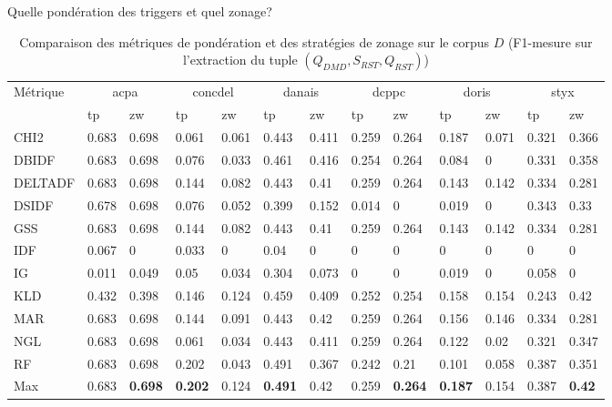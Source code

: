 \documentclass[newPxFont,pagenumber]{beamer}
\begin{document}
\begin{frame}{Quelle pondération des triggers et quel  zonage?}
\begin{table}[]
\tiny
\begin{flushleft}
\caption{Comparaison des métriques de pondération et des stratégies de zonage sur le corpus $D$ (F1-mesure sur l'extraction du tuple $(Q_{DMD},S_{RST}, Q_{RST})$)}
\label{my-label}
\begin{tabular}{l|ll|ll|ll|ll|ll|ll}
Métrique & \multicolumn{2}{c|}{acpa} &  \multicolumn{2}{c|}{concdel}  &  \multicolumn{2}{c|}{danais} &  \multicolumn{2}{c|}{dcppc} &  \multicolumn{2}{c|}{doris}   &  \multicolumn{2}{c}{styx}    \\ \noalign{\smallskip}
\hline
         & tp    & zw    & tp      & zw    & tp     & zw    & tp    & zw    & tp    & zw    & tp    & zw    \\ \noalign{\smallskip}
\hline
CHI2     & 0.683 & 0.698 & 0.061   & 0.061 & 0.443  & 0.411 & 0.259 & 0.264 & 0.187 & 0.071 & 0.321 & 0.366 \\
DBIDF    & 0.683 & 0.698 & 0.076   & 0.033 & 0.461  & 0.416 & 0.254 & 0.264 & 0.084 & 0     & 0.331 & 0.358 \\
DELTADF  & 0.683 & 0.698 & 0.144   & 0.082 & 0.443  & 0.41  & 0.259 & 0.264 & 0.143 & 0.142 & 0.334 & 0.281 \\
DSIDF    & 0.678 & 0.698 & 0.076   & 0.052 & 0.399  & 0.152 & 0.014 & 0     & 0.019 & 0     & 0.343 & 0.33  \\
GSS      & 0.683 & 0.698 & 0.144   & 0.082 & 0.443  & 0.41  & 0.259 & 0.264 & 0.143 & 0.142 & 0.334 & 0.281 \\
IDF      & 0.067 & 0     & 0.033   & 0     & 0.04   & 0     & 0     & 0     & 0     & 0     & 0     & 0     \\
IG       & 0.011 & 0.049 & 0.05    & 0.034 & 0.304  & 0.073 & 0     & 0     & 0.019 & 0     & 0.058 & 0     \\
KLD      & 0.432 & 0.398 & 0.146   & 0.124 & 0.459  & 0.409 & 0.252 & 0.254 & 0.158 & 0.154 & 0.243 & 0.42  \\
MAR      & 0.683 & 0.698 & 0.144   & 0.091 & 0.443  & 0.42  & 0.259 & 0.264 & 0.156 & 0.146 & 0.334 & 0.281 \\
NGL      & 0.683 & 0.698 & 0.061   & 0.034 & 0.443  & 0.411 & 0.259 & 0.264 & 0.122 & 0.02  & 0.321 & 0.347 \\
RF       & 0.683 & 0.698 & 0.202   & 0.043 & 0.491  & 0.367 & 0.242 & 0.21  & 0.101 & 0.058 & 0.387 & 0.351 \\ \hline
 \noalign{\smallskip}
\hline
Max        & 0.683 & \textbf{0.698} & \textbf{0.202}   & 0.124  & \textbf{0.491}  & 0.42  & 0.259 & \textbf{0.264} & \textbf{0.187} & 0.154 & 0.387 & \textbf{0.42} 
\end{tabular}


\end{flushleft}
\end{table}
\end{frame}
\end{document}
